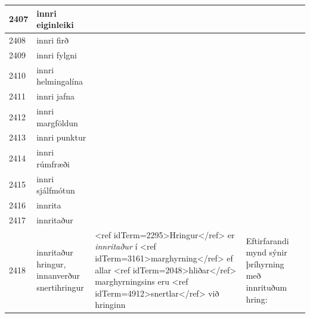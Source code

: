 \begin{longtable}{p{}|p{}|p{}|p{}|p{}}
\hline
2407 & innri eiginleiki &  &  &  \\
\hline
2408 & innri firð &  &  &  \\
\hline
2409 & innri fylgni &  &  &  \\
\hline
2410 & innri helmingalína &  &  &  \\
\hline
2411 & innri jafna &  &  &  \\
\hline
2412 & innri margföldun &  &  &  \\
\hline
2413 & innri punktur &  &  &  \\
\hline
2414 & innri rúmfræði &  &  &  \\
\hline
2415 & innri sjálfmótun &  &  &  \\
\hline
2416 & innrita &  &  &  \\
\hline
2417 & innritaður &  &  &  \\
\hline
2418 & innritaður hringur, innanverður snertihringur & <ref idTerm=2295>Hringur</ref> er \textit{innritaður} í <ref idTerm=3161>marghyrning</ref> ef allar <ref idTerm=2048>hliðar</ref> marghyrningsins eru <ref idTerm=4912>snertlar</ref> við hringinn & Eftirfarandi mynd sýnir þríhyrning með innrituðum hring:


\end{longtable}
